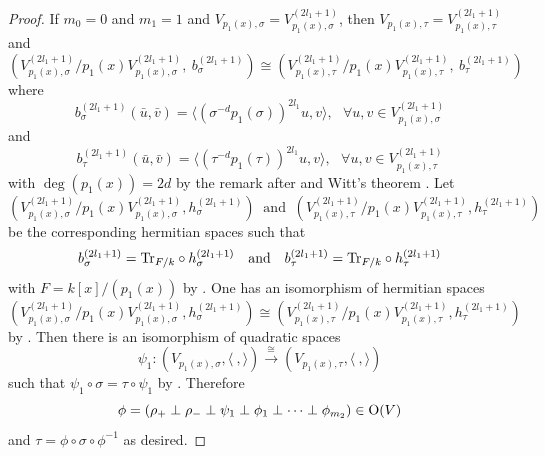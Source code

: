 \documentclass[12pt]{amsart}
\begin{document}
\begin{proof}
If $m_0=0$ and $m_1=1$ and $V_{p_1(x), \sigma}=V_{p_1(x), \sigma}^{(2l_1+1)}$,  then  $V_{p_1(x), \tau}=V_{p_1(x), \tau}^{(2l_1+1)}$ and 
$$ ( V_{p_1(x), \sigma}^{(2l_1+1)}/p_1(x) V_{p_1(x), \sigma}^{(2l_1+1)}, \ b_\sigma^{(2l_1+1)} )\cong (V_{p_1(x), \tau}^{(2l_1+1)}/ p_1(x) V_{p_1(x), \tau}^{(2l_1+1)}, \ b_{\tau}^{(2l_1+1)}) $$
 where 
\begin{equation} \label{bil-s} b_\sigma^{(2l_1+1)} (\bar u, \bar v) = \langle (\sigma^{-d} p_1(\sigma))^{2l_1} u, v \rangle , \ \ \ \forall  u, v \in V_{p_1(x), \sigma}^{(2l_1+1)} \end{equation}
and 
\begin{equation} \label{bil-t}  b_\tau^{(2l_1+1)} (\bar u, \bar v) = \langle (\tau^{-d} p_1(\tau) )^{2l_1} u ,  v \rangle , \ \ \ \forall  u, v \in V_{p_1(x), \tau}^{(2l_1+1)} \end{equation}  with $\deg (p_1(x))=2d$ by the remark after \cite[Theorem 3.3]{Mil} and Witt's theorem \cite[42:16. Theorem]{OM}. Let 
$$(V_{p_1(x), \sigma}^{(2l_1+1)}/p_1(x) V_{p_1(x), \sigma}^{(2l_1+1)}, h_\sigma^{(2l_1+1)}) \ \text{ and } \ (V_{p_1(x), \tau}^{(2l_1+1)}/ p_1(x) V_{p_1(x), \tau}^{(2l_1+1)}, h_\tau^{(2l_1+1)})$$ be the corresponding hermitian spaces such that 
$$ b_\sigma^{(2l_1+1)}= {\rm Tr}_{F/k}  \circ h_\sigma^{(2l_1+1)} \ \ \ \text{and} \ \ \ b_{\tau}^{(2l_1+1)} = {\rm Tr}_{F/k} \circ h_\tau^{(2l_1+1)} $$
with $F=k[x]/(p_1(x))$ by \cite[Lemma 1.1]{Mil}.  One has an isomorphism of hermitian spaces
$$(V_{p_1(x), \sigma}^{(2l_1+1)}/p_1(x) V_{p_1(x), \sigma}^{(2l_1+1)}, h_\sigma^{(2l_1+1)}) \cong (V_{p_1(x), \tau}^{(2l_1+1)}/ p_1(x) V_{p_1(x), \tau}^{(2l_1+1)}, h_\tau^{(2l_1+1)})$$
by \cite[Theorem 2.7]{Mil}. 
Then there is an isomorphism of quadratic spaces
$$ \psi_1:  (V_{p_1(x), \sigma}, \langle \ , \rangle ) \xrightarrow{\cong} (V_{p_1(x), \tau}, \langle \ , \rangle ) $$
such that $\psi_1 \circ \sigma= \tau \circ \psi_1$ by \cite[Theorem 3.3]{Mil}. Therefore
$$ \phi = (\rho_+\perp \rho_- \perp \psi_1 \perp \phi_1 \perp \cdots \perp  \phi_{m_2} ) \in {\rm O}(V) $$ and $\tau=\phi \circ \sigma \circ \phi^{-1}$ as desired. 

\medskip


\end{proof}
\end{document}
